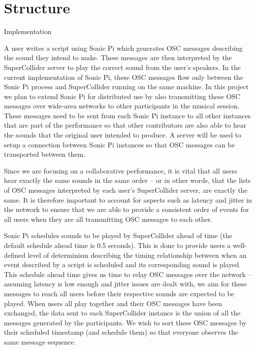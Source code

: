\documentclass[12pt,a4paper,twoside]{article}
\begin{document}
\section*{Structure}

\Large
Implementation

\normalsize
A user writes a script using Sonic Pi which generates OSC messages describing the sound they intend to make. These messages are then interpreted by the SuperCollider server to play the correct sound from the user's speakers. In the current implementation of Sonic Pi, these OSC messages flow only between the Sonic Pi process and SuperCollider running on the same machine. In this project we plan to extend Sonic Pi for distributed use by also transmitting these OSC messages over wide-area networks to other participants in the musical session. These messages need to be sent from each Sonic Pi instance to all other instances that are part of the performance so that other contributors are also able to hear the sounds that the original user intended to produce. A server will be used to setup a connection between Sonic Pi instances so that OSC messages can be transported between them.

Since we are focusing on a collaborative performance, it is vital that all users hear exactly the same sounds in the same order -- or in other words, that the lists of OSC messages interpreted by each user's SuperCollider server, are exactly the same. It is therefore important to account for aspects such as latency and jitter in the network to ensure that we are able to provide a consistent order of events for all users when they are all transmitting OSC messages to each other.

Sonic Pi schedules sounds to be played by SuperCollider ahead of time (the default schedule ahead time is 0.5 seconds). This is done to provide users a well-defined level of determinism describing the timing relationship between when an event described by a script is scheduled and its corresponding sound is played. This schedule ahead time gives us time to relay OSC messages over the network -- assuming latency is low enough and jitter issues are dealt with, we aim for these messages to reach all users before their respective sounds are expected to be played. When users all play together and their OSC messages have been exchanged, the data sent to each SuperCollider instance is the union of all the messages generated by the participants. We wish to sort these OSC messages by their scheduled timestamp (and schedule them) so that everyone observes the same message sequence.
\end{document}
